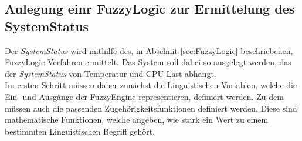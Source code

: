 \subsection{Aulegung einr FuzzyLogic zur Ermittelung des SystemStatus}
Der \textit{SystemStatus} wird mithilfe des, in Abschnit \ref{sec:FuzzyLogic} beschriebenen, FuzzyLogic Verfahren ermittelt. Das System soll dabei so ausgelegt werden, das der \textit{SystemStatus} von Temperatur und CPU Last abhängt.\\
Im ersten Schritt müssen daher zunächst die Linguistischen Variablen, welche die Ein- und Ausgänge der FuzzyEngine representieren, definiert werden. Zu dem müssen auch die passenden Zugehörigkeitsfunktionen definiert werden. Diese sind mathematische Funktionen, welche angeben, wie stark ein Wert zu einem bestimmten Linguistischen Begriff gehört. \cite{FuzzyLogicGeeks}\\ 

